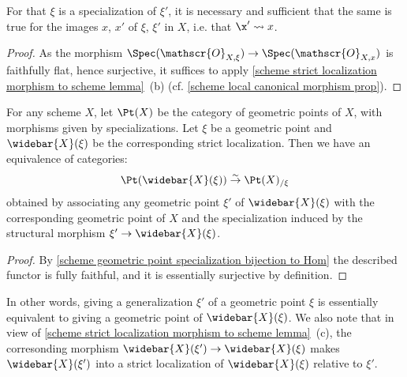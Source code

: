 \begin{corollary}\label{scheme geometric point specialization iff underlying point}
For that $\xi$ is a specialization of $\xi'$, it is necessary and sufficient that the same is true for the images $x$, $x'$ of $\xi$, $\xi'$ in $X$, i.e. that $\x'\rightsquigarrow x$.
\end{corollary}
\begin{proof}
As the morphism $\Spec(\mathscr{O}_{X,\xi})\to\Spec(\mathscr{O}_{X,x})$ is faithfully flat, hence surjective, it suffices to apply \cref{scheme strict localization morphism to scheme lemma}~(b) (cf. \cref{scheme local canonical morphism prop}).
\end{proof}

\begin{corollary}\label{scheme geometric point category equivalence}
For any scheme $X$, let $\Pt(X)$ be the category of geometric points of $X$, with morphisms given by specializations. Let $\xi$ be a geometric point and $\widebar{X}(\xi)$ be the corresponding strict localization. Then we have an equivalence of categories:
\[\Pt(\widebar{X}(\xi))\stackrel{\sim}{\to} \Pt(X)_{/\xi}\]
obtained by associating any geometric point $\xi'$ of $\widebar{X}(\xi)$ with the corresponding geometric point of $X$ and the specialization induced by the structural morphism $\xi'\to\widebar{X}(\xi)$.
\end{corollary}
\begin{proof}
By \cref{scheme geometric point specialization bijection to Hom} the described functor is fully faithful, and it is essentially surjective by definition.
\end{proof}

In other words, giving a generalization $\xi'$ of a geometric point $\xi$ is essentially equivalent to giving a geometric point of $\widebar{X}(\xi)$. We also note that in view of \cref{scheme strict localization morphism to scheme lemma}~(c), the corresonding morphism $\widebar{X}(\xi')\to\widebar{X}(\xi)$ makes $\widebar{X}(\xi')$ into a strict localization of $\widebar{X}(\xi)$ relative to $\xi'$.\par


